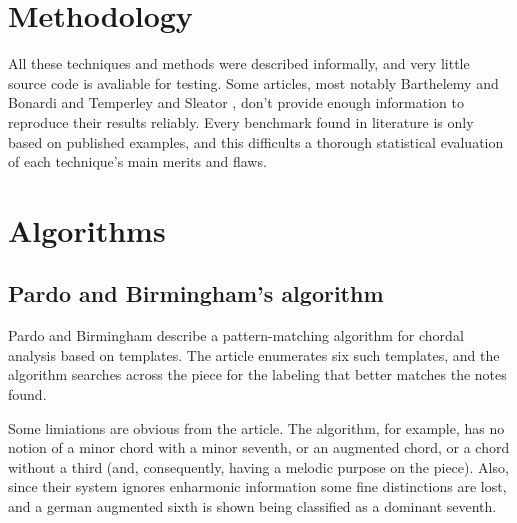 \documentclass{article}
\newcommand{\comment}[1]{}
\begin{document}
\section{Methodology}
\label{sec:methodology}

\comment{
  ==> um problema de information retrieval
  ==> precision, recall (e significado)
  ==> corais de bach
}

All these techniques and methods were described informally, and very
little source code is avaliable for testing. Some articles, most
notably Barthelemy and Bonardi \cite{barthelemy.ea:figured} and
Temperley and Sleator \cite{temperley.ea:modeling}, don't provide
enough information to reproduce their results reliably. Every
benchmark found in literature \cite{pardo.ea:automated,
  barthelemy.ea:figured, tsui:harmonic, taube:automatic,
  illescas.ea:harmonic} is only based on published examples, and this
difficults a thorough statistical evaluation of each technique's main
merits and flaws.




\section{Algorithms}
\label{sec:algorithms}

\comment{
  ==> features usadas pelos algoritmos
  ==> técnicas variadas: busca X learning
}

\subsection{Pardo and Birmingham's algorithm}
\label{sec:pardo}

\comment{
  ==> algoritmo descrito em \cite{pardo.ea:algorithms}
  ==> baseado em templates e pattern matching
  ==> ótima recall, precisão não muito legal
  ==> ignora enarmonia
  ==> feature é um conjunto de pitches
  ==> nossa extensão:
  ===> mais templates
  ===> enarmonia
  ==> regras de desempate: a princípio promissoras, mas a abordagem
  não escala bem
}

Pardo and Birmingham \cite{pardo.ea:algorithms} describe a
pattern-matching algorithm for chordal analysis based on
templates. The article enumerates six such templates, and the
algorithm searches across the piece for the labeling that better
matches the notes found.

Some limiations are obvious from the article. The algorithm, for
example, has no notion of a minor chord with a minor seventh, or an
augmented chord, or a chord without a third (and, consequently, having
a melodic purpose on the piece). Also, since their system ignores
enharmonic information some fine distinctions are lost, and a german
augmented sixth is shown being classified as a dominant seventh.
\end{document}
